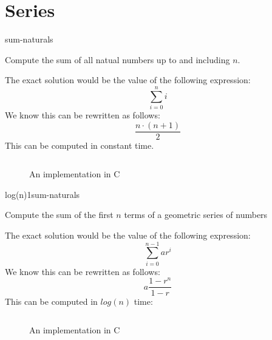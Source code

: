 \documentclass[main.tex]{subfiles}
\begin{document}
\chapter{Series}

\begin{libraryfile}
  \begin{algorithm}{1}{1}{sum-naturals}
    \begin{algorithm-description}
        Compute the sum of all natual numbers up to and including $n$.
    \end{algorithm-description}
    \begin{algorithm-explanation}
      The exact solution would be the value of the following expression:
      \[ \sum_{i=0}^{n}i \]
      We know this can be rewritten as follows:
      \[ \frac{n\cdot(n+1)}{2} \]
      This can be computed in constant time.
      \begin{figure}[H]
        \centering
        \inputminted[firstline=5, lastline=7]{c}{\lib{c}{series.c}}
        \caption{An implementation in C}
      \end{figure}
    \end{algorithm-explanation}
  \end{algorithm}

  \begin{algorithm}{log(n)}{1}{sum-naturals}
    \begin{algorithm-description}
        Compute the sum of the first $n$ terms of a geometric series of numbers
    \end{algorithm-description}
    \begin{algorithm-explanation}
      The exact solution would be the value of the following expression:
      \[ \sum_{i=0}^{n-1}ar^{i} \]
      We know this can be rewritten as follows:
      \[ a\frac{1 - r^{n}}{1 - r} \]
      This can be computed in $log(n)$ time:
      \begin{figure}[H]
        \centering
        \inputminted[firstline=10, lastline=12]{c}{\lib{c}{series.c}}
        \caption{An implementation in C}
      \end{figure}
    \end{algorithm-explanation}
  \end{algorithm}
\end{libraryfile}
\end{document}
